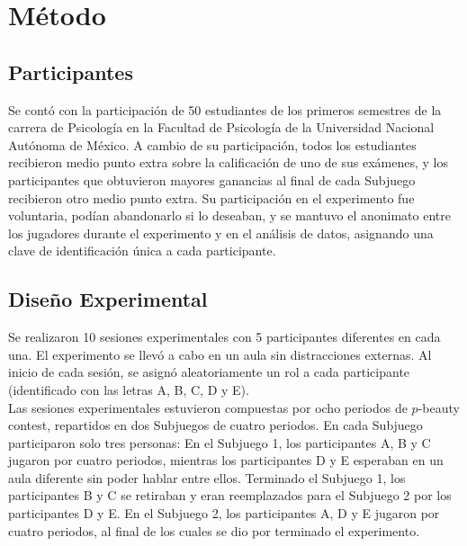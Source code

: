 
\chapter{Método} %

\label{Cap_Exp} %

\section{Participantes}

Se contó con la participación de 50 estudiantes de los primeros semestres de la carrera de Psicología en la Facultad de Psicología de la Universidad Nacional Autónoma de México. A cambio de su participación, todos los estudiantes recibieron medio punto extra sobre la  calificación de uno de sus exámenes, y  los participantes que obtuvieron mayores ganancias al final de cada Subjuego recibieron otro medio punto extra. Su participación en el experimento fue voluntaria, podían abandonarlo si lo deseaban, y se mantuvo el anonimato entre los jugadores durante el experimento y en el análisis de datos, asignando una clave de identificación única a cada participante.

\section{Diseño Experimental}

Se realizaron 10 sesiones experimentales con  5 participantes diferentes en cada una. El experimento se llevó a cabo en un aula sin distracciones externas. Al inicio de cada sesión, se asignó aleatoriamente un rol a cada participante (identificado con las letras A, B, C, D y E).\\

Las sesiones experimentales estuvieron compuestas por ocho periodos de $p$-beauty contest, repartidos en dos Subjuegos de cuatro periodos. En cada Subjuego participaron solo tres personas: En el Subjuego 1, los participantes A, B y C jugaron por cuatro periodos, mientras los participantes D y E esperaban en un aula diferente sin poder hablar entre ellos. Terminado el Subjuego 1, los participantes B y C se retiraban y eran reemplazados para el Subjuego 2 por los participantes D y E. En el Subjuego 2, los participantes A, D y E jugaron por cuatro periodos, al final de los cuales se dio por terminado el experimento.\\

